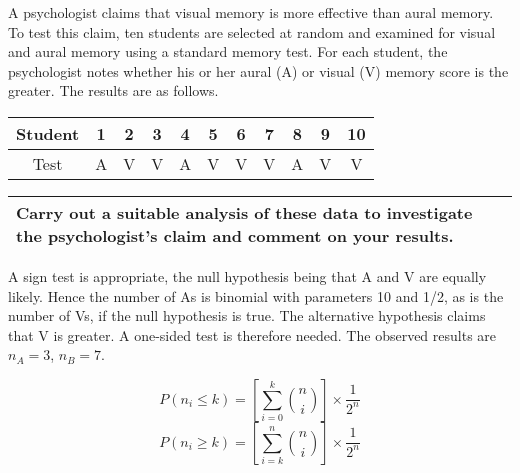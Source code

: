 \documentclass[a4paper,12pt]{article}
\begin{document}
	
	\large 
	\noindent A psychologist claims that visual memory is more effective than aural memory.  To test this claim, ten students are selected at random and examined for visual and aural memory using a standard memory test.  For each student, the psychologist notes whether his or her aural (A) or visual (V) memory score is the greater.  The results are as follows. 
	\begin{center}
		\begin{tabular}{|c||c|c|c|c|c|c|c|c|c|c|} 
			\hline 
			Student & 1 & 2 & 3 & 4 & 5 & 6 & 7 & 8 & 9 & 10\\ \hline 
			Test & A&  V&  V&  A & V & V & V & A & V & V \\ \hline 
		\end{tabular}
	\end{center}
	
	\begin{table}[ht!]
		
		\centering
		
		\begin{tabular}{|p{15cm}|}
			
			\hline  
			
			\large  
			Carry out a suitable analysis of these data to investigate the psychologist’s claim and comment on your results. 
			
			
			\\ \hline
			
		\end{tabular}
		
	\end{table}
	\bigskip 
	
	\large
	\noindent A sign test is appropriate, the null hypothesis being that A and V are equally
	likely. Hence the number of As is binomial with parameters
	10 and 1/2, as is the number of Vs, if the null hypothesis is true. The alternative
	hypothesis claims that V is greater. A one-sided test is therefore needed.
	The observed results are $n_A = 3$, $n_B = 7$.
	\begin{framed}
		\[P( n_i \leq k) =  \left[ \sum^{k}_{i=0}  { n \choose i} \right] \times \frac{1}{2^n}\]
		\[P( n_i \geq k) =  \left[ \sum^{n}_{i=k}  { n \choose i} \right] \times \frac{1}{2^n}\]
	\end{framed}
	
\end{document}

